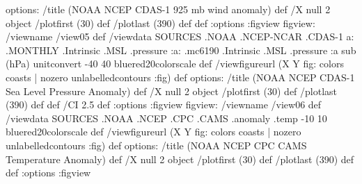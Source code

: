 \begin{ingrid}
options:
/title (NOAA NCEP CDAS-1 925 mb wind anomaly) def
/X null 2 object
/plotfirst (30) def
/plotlast (390) def
def
:options
:figview
figview:
/viewname /view05 def
/viewdata  
 SOURCES .NOAA .NCEP-NCAR .CDAS-1
  a: .MONTHLY .Intrinsic .MSL .pressure
    :a: .mc6190 .Intrinsic .MSL .pressure :a
   sub 
(hPa) unitconvert
-40 40 bluered20colorscale
 def
/viewfigureurl (X Y fig: colors coasts | nozero unlabelledcontours :fig) def
options:
/title (NOAA NCEP CDAS-1 Sea Level Pressure Anomaly) def
/X null 2 object
/plotfirst (30) def
/plotlast (390) def
def
/CI 2.5 def
:options
:figview
figview:
/viewname /view06 def
/viewdata   
SOURCES .NOAA .NCEP .CPC .CAMS .anomaly .temp
-10 10 bluered20colorscale
    def
/viewfigureurl (X Y fig: colors coasts | nozero unlabelledcontours :fig) def
options:
/title (NOAA NCEP CPC CAMS Temperature Anomaly) def
/X null 2 object
/plotfirst (30) def
/plotlast (390) def
def
:options
:figview
\end{ingrid}
